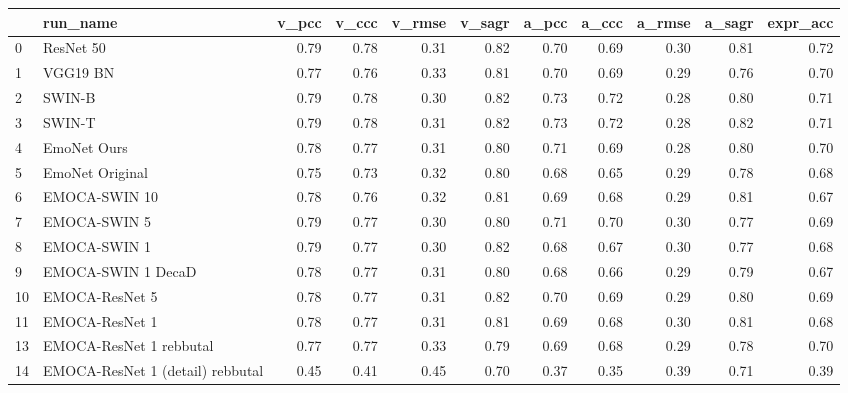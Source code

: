 \begin{tabular}{llrrrrrrrrr}
\toprule
{} &                            run\_name &  v\_pcc &  v\_ccc &  v\_rmse &  v\_sagr &  a\_pcc &  a\_ccc &  a\_rmse &  a\_sagr &  expr\_acc \\
\midrule
0  &                           ResNet 50 &   0.79 &   0.78 &    0.31 &    0.82 &   0.70 &   0.69 &    0.30 &    0.81 &      0.72 \\
1  &                            VGG19 BN &   0.77 &   0.76 &    0.33 &    0.81 &   0.70 &   0.69 &    0.29 &    0.76 &      0.70 \\
2  &                              SWIN-B &   0.79 &   0.78 &    0.30 &    0.82 &   0.73 &   0.72 &    0.28 &    0.80 &      0.71 \\
3  &                              SWIN-T &   0.79 &   0.78 &    0.31 &    0.82 &   0.73 &   0.72 &    0.28 &    0.82 &      0.71 \\
4  &                         EmoNet Ours &   0.78 &   0.77 &    0.31 &    0.80 &   0.71 &   0.69 &    0.28 &    0.80 &      0.70 \\
5  &                     EmoNet Original &   0.75 &   0.73 &    0.32 &    0.80 &   0.68 &   0.65 &    0.29 &    0.78 &      0.68 \\
6  &                       EMOCA-SWIN 10 &   0.78 &   0.76 &    0.32 &    0.81 &   0.69 &   0.68 &    0.29 &    0.81 &      0.67 \\
7  &                        EMOCA-SWIN 5 &   0.79 &   0.77 &    0.30 &    0.80 &   0.71 &   0.70 &    0.30 &    0.77 &      0.69 \\
8  &                        EMOCA-SWIN 1 &   0.79 &   0.77 &    0.30 &    0.82 &   0.68 &   0.67 &    0.30 &    0.77 &      0.68 \\
9  &                  EMOCA-SWIN 1 DecaD &   0.78 &   0.77 &    0.31 &    0.80 &   0.68 &   0.66 &    0.29 &    0.79 &      0.67 \\
10 &                      EMOCA-ResNet 5 &   0.78 &   0.77 &    0.31 &    0.82 &   0.70 &   0.69 &    0.29 &    0.80 &      0.69 \\
11 &                      EMOCA-ResNet 1 &   0.78 &   0.77 &    0.31 &    0.81 &   0.69 &   0.68 &    0.30 &    0.81 &      0.68 \\
13 &             EMOCA-ResNet 1 rebbutal &   0.77 &   0.77 &    0.33 &    0.79 &   0.69 &   0.68 &    0.29 &    0.78 &      0.70 \\
14 &    EMOCA-ResNet 1 (detail) rebbutal &   0.45 &   0.41 &    0.45 &    0.70 &   0.37 &   0.35 &    0.39 &    0.71 &      0.39 \\

\end{tabular}
